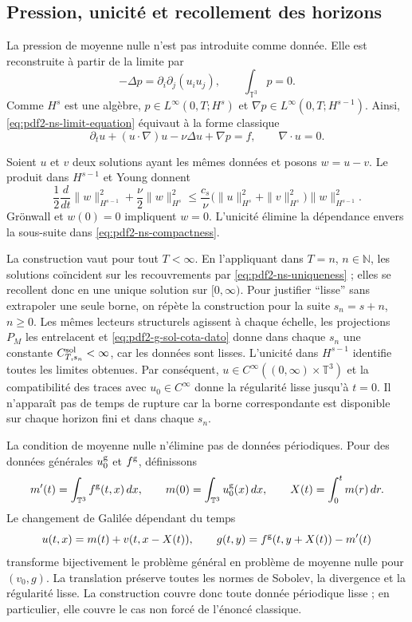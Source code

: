 \subsection{Pression, unicité et recollement des horizons}

La pression de moyenne nulle n'est pas introduite comme donnée. Elle est reconstruite à partir de la limite par
\begin{equation}\label{eq:pdf2-ns-pressure}
 -\Delta p=\partial_i\partial_j(u_i u_j),
 \qquad \int_{\mathbb T^3}p=0.
\end{equation}
Comme $H^s$ est une algèbre, $p\in L^\infty(0,T;H^s)$ et
$\nabla p\in L^\infty(0,T;H^{s-1})$. Ainsi,
\eqref{eq:pdf2-ns-limit-equation} équivaut à la forme classique
\[
 \partial_tu+(u\cdot\nabla)u-\nu\Delta u+\nabla p=f,
 \qquad\nabla\!\cdot u=0.
\]

Soient $u$ et $v$ deux solutions ayant les mêmes données et posons $w=u-v$. Le produit
dans $H^{s-1}$ et Young donnent
\begin{equation}\label{eq:pdf2-ns-uniqueness}
 \frac12\frac{d}{dt}\|w\|_{H^{s-1}}^2
 +\frac\nu2\|w\|_{H^s}^2
 \le \frac{c_s}{\nu}
 \bigl(\|u\|_{H^s}^2+\|v\|_{H^s}^2\bigr)
 \|w\|_{H^{s-1}}^2.
\end{equation}
Grönwall et $w(0)=0$ impliquent $w=0$. L'unicité élimine la dépendance envers la
sous-suite dans \eqref{eq:pdf2-ns-compactness}.

La construction vaut pour tout $T<\infty$. En l'appliquant dans $T=n$, $n\in\mathbb N$,
les solutions coïncident sur les recouvrements par
\eqref{eq:pdf2-ns-uniqueness} ; elles se recollent donc en une unique solution sur
$[0,\infty)$. Pour justifier ``lisse'' sans extrapoler une seule borne, on répète
la construction pour la suite $s_n=s+n$, $n\ge0$. Les mêmes lecteurs
structurels agissent à chaque échelle, les projections $P_M$ les entrelacent et
\eqref{eq:pdf2-g-sol-cota-dato} donne dans chaque $s_n$ une constante
$C_{T,s_n}^{\rm sol}<\infty$, car les données sont lisses. L'unicité dans
$H^{s-1}$ identifie toutes les limites obtenues. Par
conséquent, $u\in C^\infty((0,\infty)\times\mathbb T^3)$ et la compatibilité des
traces avec $u_0\in C^\infty$ donne la régularité lisse jusqu'à $t=0$. Il n'apparaît pas de temps de
rupture car la borne correspondante est disponible sur chaque horizon
fini et dans chaque $s_n$.

La condition de moyenne nulle n'élimine pas de données périodiques. Pour des données générales
$u_0^{\rm g}$ et $f^{\rm g}$, définissons
\[
 m'(t)=\int_{\mathbb T^3}f^{\rm g}(t,x)\,dx,\qquad
 m(0)=\int_{\mathbb T^3}u_0^{\rm g}(x)\,dx,\qquad
 X(t)=\int_0^tm(r)\,dr.
\]
Le changement de Galilée dépendant du temps
\begin{equation}\label{eq:pdf2-ns-mean-reduction}
 u(t,x)=m(t)+v(t,x-X(t)),\qquad
 g(t,y)=f^{\rm g}(t,y+X(t))-m'(t)
\end{equation}
transforme bijectivement le problème général en problème de moyenne nulle
pour $(v_0,g)$. La translation préserve toutes les normes de Sobolev, la
divergence et la régularité lisse. La construction couvre donc toute donnée périodique
lisse ; en particulier, elle couvre le cas non forcé de l'énoncé classique.

